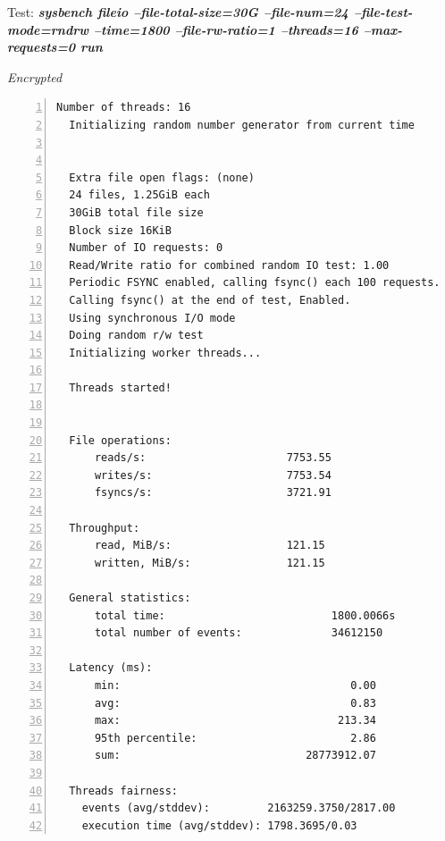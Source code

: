 \newpage
\begin{center}
  Test: \textbf{\textit{sysbench fileio --file-total-size=30G --file-num=24 --file-test-mode=rndrw --time=1800 --file-rw-ratio=1 --threads=16 --max-requests=0 run}}  
\end{center}
\vspace*{-\baselineskip}
\noindent\begin{minipage}[t]{0.45\linewidth}
  \centering
  \textit{Encrypted}
  \begin{lstlisting}[basicstyle=\tiny,frame=single, numbers=left, label=cpu_test1]
  Number of threads: 16
  Initializing random number generator from current time
  
  
  Extra file open flags: (none)
  24 files, 1.25GiB each
  30GiB total file size
  Block size 16KiB
  Number of IO requests: 0
  Read/Write ratio for combined random IO test: 1.00
  Periodic FSYNC enabled, calling fsync() each 100 requests.
  Calling fsync() at the end of test, Enabled.
  Using synchronous I/O mode
  Doing random r/w test
  Initializing worker threads...
  
  Threads started!
  
  
  File operations:
      reads/s:                      7753.55
      writes/s:                     7753.54
      fsyncs/s:                     3721.91
  
  Throughput:
      read, MiB/s:                  121.15
      written, MiB/s:               121.15
  
  General statistics:
      total time:                          1800.0066s
      total number of events:              34612150
  
  Latency (ms):
      min:                                    0.00
      avg:                                    0.83
      max:                                  213.34
      95th percentile:                        2.86
      sum:                             28773912.07
  
  Threads fairness:
    events (avg/stddev):         2163259.3750/2817.00
    execution time (avg/stddev): 1798.3695/0.03
  \end{lstlisting}
\end{minipage}
\hspace{0.5cm}
